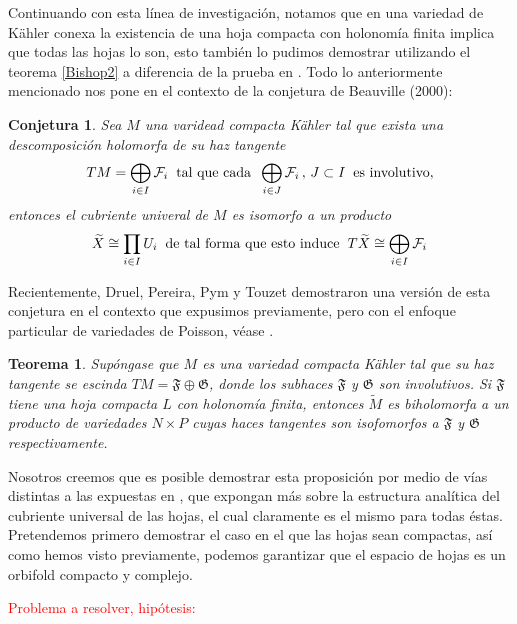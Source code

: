 \documentclass[letterpaper]{report}
\newtheorem{teorema}{Teorema}[chapter]
\newtheorem{conjetura}{Conjetura}
\begin{document}
Continuando con esta l\'inea de investigaci\'on, notamos que en una variedad de K\"ahler conexa la existencia de una hoja compacta 
con holonom\'ia finita implica que todas las hojas lo son, esto tambi\'en lo pudimos demostrar utilizando el teorema \ref{Bishop2} a 
diferencia de la prueba en \cite{Pereira}. Todo lo anteriormente mencionado nos pone en el contexto de la conjetura de Beauville (2000):
\begin{conjetura}\label{Beauville}
        Sea $M$ una varidead compacta K\"ahler tal que exista una descomposici\'on holomorfa de su haz tangente
        \[
        TM=\bigoplus_{i\in I}\mathcal{F}_i\hspace{0.2cm}\text{tal que cada}\hspace{0.2cm}\bigoplus_{i\in J}\mathcal{F}_i\,,\,J\subset I\hspace{0.2cm}\text{es involutivo},
        \]
        entonces el cubriente univeral de $M$ es isomorfo a un producto 
        \[
        \widetilde{X}\cong\prod_{i\in I}U_i\hspace{0.2cm}\text{de tal forma que esto induce}\hspace{0.2cm}T\widetilde{X}\cong\bigoplus_{i\in I}\mathcal{F}_i
        \]
\end{conjetura}
Recientemente, Druel, Pereira, Pym y Touzet demostraron una versi\'on de esta conjetura en el contexto que expusimos previamente,
pero con el enfoque particular de variedades de Poisson, v\'ease \cite{DPPT}.
\begin{teorema}
        Sup\'ongase que $M$ es una variedad compacta K\"ahler tal que su haz tangente se escinda $TM=\mathfrak{F}\oplus\mathfrak{G}$, donde
        los subhaces $\mathfrak{F}$ y $\mathfrak{G}$ son involutivos. Si $\mathfrak{F}$ tiene una hoja compacta $L$ con holonom\'ia finita,
        entonces $\widetilde{M}$ es biholomorfa a un producto de variedades $N\times P$ cuyas haces tangentes son isofomorfos
        a $\mathfrak{F}$ y $\mathfrak{G}$ respectivamente.
\end{teorema}
\noindent Nosotros creemos que es posible demostrar esta proposici\'on por medio de v\'ias distintas a las expuestas en \cite{DPPT}, que 
expongan m\'as sobre la estructura anal\'itica del cubriente universal de las hojas, el cual claramente es el mismo para todas \'estas.
Pretendemos primero demostrar el caso en el que las hojas sean compactas, as\'i como hemos visto previamente, podemos garantizar que el espacio de
hojas es un orbifold compacto y complejo.
\\
                                \textcolor{red}{\centerline{Problema a resolver, hip\'otesis:}} 
\end{document}
